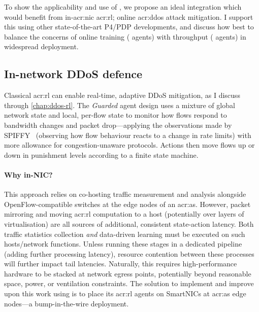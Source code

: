 To show the applicability and use of \approachshort{}, we propose an ideal integration which would benefit from in-\gls{acr:nic} \gls{acr:rl}; online \gls{acr:ddos} attack mitigation.
I support this using other state-of-the-art P4/PDP developments, and discuss how best to balance the concerns of online training (\Coopfw{} agents) with throughput (\Indfw{} agents) in widespread deployment.


\subsection{In-network DDoS defence}\label{sec:integ-1}
Classical \gls{acr:rl} can enable real-time, adaptive DDoS mitigation, as I discuss through \cref{chap:ddos-rl}.
The \emph{Guarded} agent design uses a mixture of global network state and local, per-flow state to monitor how flows respond to bandwidth changes and packet drop---applying the observations made by SPIFFY~\parencite{DBLP:conf/ndss/KangGS16} (observing how flow behaviour reacts to a change in rate limits) with more allowance for congestion-unaware protocols.
Actions then move flows up or down in punishment levels according to a finite state machine.

\paragraph{Why in-NIC?}
This approach relies on co-hosting traffic measurement and analysis alongside OpenFlow-compatible switches at the edge nodes of an \gls{acr:as}.
However, packet mirroring and moving \gls{acr:rl} computation to a host (potentially over layers of virtualisation) are all sources of additional, consistent state-action latency.
Both traffic statistics collection \emph{and} data-driven learning must be executed on such hosts/network functions.
Unless running these stages in a dedicated pipeline (adding further processing latency), resource contention between these processes will further impact tail latencies.
Naturally, this requires high-performance hardware to be stacked at network egress points, potentially beyond reasonable space, power, or ventilation constraints.
The solution to implement and improve upon this work using \approachshort{} is to place its \gls{acr:rl} agents on SmartNICs at \gls{acr:as} edge nodes---a bump-in-the-wire deployment.

